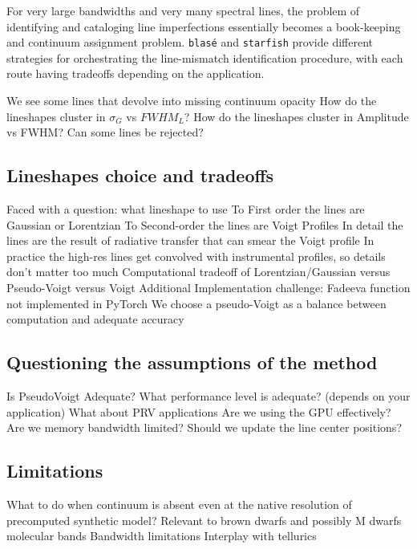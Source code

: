 \documentclass[modern]{aastex631}
\begin{document}
For very large bandwidths and very many spectral lines, the problem of identifying and cataloging line imperfections essentially becomes a book-keeping and continuum assignment problem.  \texttt{blas\'e} and \texttt{starfish} provide different strategies for orchestrating the line-mismatch identification procedure, with each route having tradeoffs depending on the application.

\begin{outline}
    \1 We see some lines that devolve into missing continuum opacity
    \1 How do the lineshapes cluster in $\sigma_G$ vs $FWHM_L$?
    \1 How do the lineshapes cluster in Amplitude vs FWHM? Can some lines be rejected?
\end{outline}


\subsection{Lineshapes choice and tradeoffs}
\begin{outline}
    \1 Faced with a question: what lineshape to use
    \2 To First order the lines are Gaussian or Lorentzian
    \2 To Second-order the lines are Voigt Profiles
    \2 In detail the lines are the result of radiative transfer that can smear the Voigt profile
    \2 In practice the high-res lines get convolved with instrumental profiles, so details don't matter too much
    \1 Computational tradeoff of Lorentzian/Gaussian versus Pseudo-Voigt versus Voigt
    \2 Additional Implementation challenge: Fadeeva function not implemented in PyTorch
    \1 We choose a pseudo-Voigt as a balance between computation and adequate accuracy
\end{outline}

\subsection{Questioning the assumptions of the method}

\begin{outline}
    \1 Is PseudoVoigt Adequate?
    \1 What performance level is adequate? (depends on your application)
    \1 What about PRV applications
    \1 Are we using the GPU effectively? Are we memory bandwidth limited?
    \1 Should we update the line center positions?
\end{outline}

\subsection{Limitations}
\begin{outline}
    \1 What to do when continuum is absent even at the native resolution of precomputed synthetic model?
    \1 Relevant to brown dwarfs and possibly M dwarfs molecular bands
    \1 Bandwidth limitations
    \1 Interplay with tellurics
\end{outline}
\end{document}
